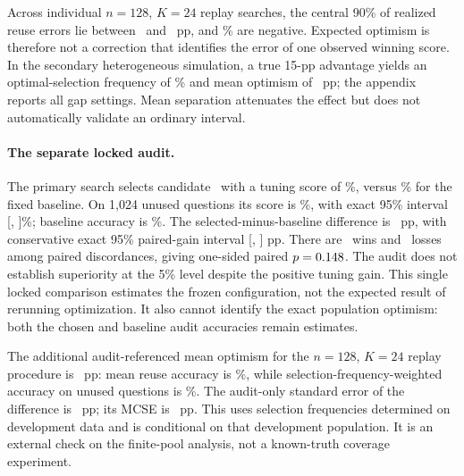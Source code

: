 \documentclass{article}
\begin{document}
\begin{table}[t]
\caption{Real-data replay with all 24 candidates: mean optimism (pp) and interval coverage (\%), $\pm1$ MCSE. The known target is the selected candidate's mean over the development population.}
\label{tab:real}
\centering\small
\end{table}

Across individual $n=128$, $K=24$ replay searches, the central 90\% of realized reuse errors lie between \RealOptimismQFive\ and \RealOptimismQNinetyFive\ pp, and \RealNegativeRate\% are negative. Expected optimism is therefore not a correction that identifies the error of one observed winning score. In the secondary heterogeneous simulation, a true 15-pp advantage yields an optimal-selection frequency of \HeteroLargeOptimal\% and mean optimism of \HeteroLargeOptimism\ pp; the appendix reports all gap settings. Mean separation attenuates the effect but does not automatically validate an ordinary interval.

\paragraph{The separate locked audit.}
The primary search selects candidate \PrimaryCandidate\ with a tuning score of \PrimaryTuneScore\%, versus \PrimaryBaselineTune\% for the fixed baseline. On 1,024 unused questions its score is \PrimaryAuditScore\%, with exact 95\% interval [\PrimaryLo, \PrimaryHi]\%; baseline accuracy is \PrimaryBaselineAudit\%. The selected-minus-baseline difference is \PrimaryAuditGain\ pp, with conservative exact 95\% paired-gain interval [\PrimaryGainLo, \PrimaryGainHi] pp. There are \PrimaryWins\ wins and \PrimaryLosses\ losses among paired discordances, giving one-sided paired $p=0.148$. The audit does not establish superiority at the 5\% level despite the positive tuning gain. This single locked comparison estimates the frozen configuration, not the expected result of rerunning optimization. It also cannot identify the exact population optimism: both the chosen and baseline audit accuracies remain estimates.

The additional audit-referenced mean optimism for the $n=128$, $K=24$ replay procedure is \RealAuditReferencedOptimism\ pp: mean reuse accuracy is \RealMeanReportedAccuracy\%, while selection-frequency-weighted accuracy on unused questions is \RealWeightedAuditAccuracy\%. The audit-only standard error of the difference is \RealAuditReferenceAuditSE\ pp; its MCSE is \RealAuditReferenceMCSE\ pp. This uses selection frequencies determined on development data and is conditional on that development population. It is an external check on the finite-pool analysis, not a known-truth coverage experiment.
\end{document}
